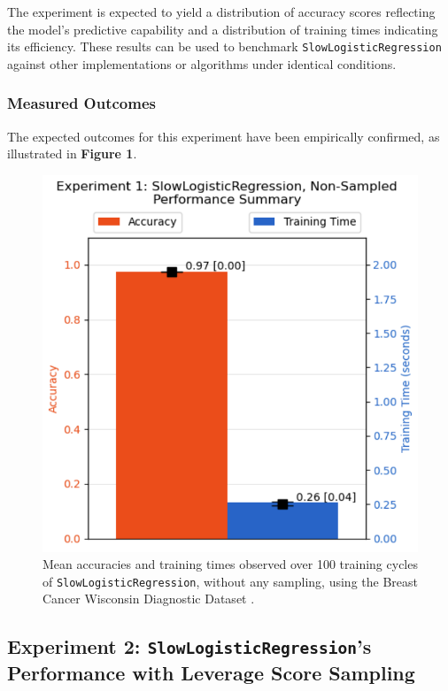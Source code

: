 \documentclass{article}
\theoremstyle{plain}
\theoremstyle{definition}
\theoremstyle{remark}
\begin{document}
The experiment is expected to yield a distribution of accuracy scores reflecting the model's predictive capability and a distribution of training times indicating its efficiency. These results can be used to benchmark \texttt{SlowLogisticRegression} against other implementations or algorithms under identical conditions.

\subsubsection{Measured Outcomes}

The expected outcomes for this experiment have been empirically confirmed, as illustrated in \textbf{Figure 1}.

\begin{figure}[ht]
	\vskip 0.2in
	\begin{center}
		\centerline{\includegraphics[width=\columnwidth]{experiment_01}}
		\caption{Mean accuracies and training times observed over 100 training cycles of \texttt{SlowLogisticRegression}, without any sampling, using the Breast Cancer Wisconsin Diagnostic Dataset \cite{breastcancer}.}
		\label{experiment_01}
	\end{center}
	\vskip -0.2in
\end{figure}


\subsection{Experiment 2: \texttt{SlowLogisticRegression}'s Performance with Leverage Score Sampling}
\end{document}
